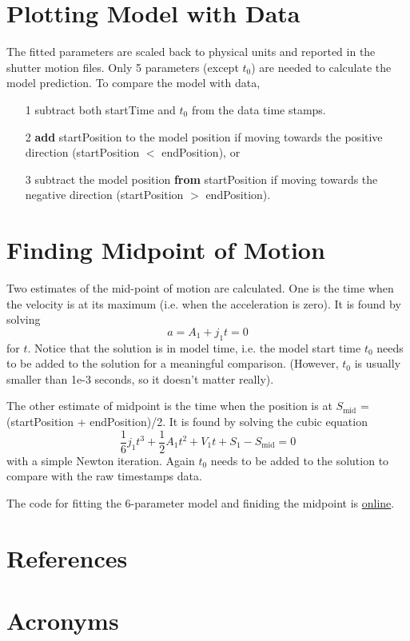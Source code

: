 \documentclass[CTN,lsstdraft,authoryear,toc]{lsstdoc}
\newcommand{\eq}[1]{\begin{equation}#1\end{equation}}
\begin{document}
\section{Plotting Model with Data}
The fitted parameters are scaled back to physical units and reported in the shutter motion files. Only 5 parameters (except $t_0$) are needed to calculate the model prediction. To compare the model with data, 
\begin{itemize}
    \item[1] subtract both startTime and $t_0$ from the data time stamps.
    \item[2] \textbf{add} startPosition to the model position if moving towards the positive direction (startPosition $<$ endPosition), or
    \item[3] subtract the model position \textbf{from} startPosition if moving towards the negative direction (startPosition $>$ endPosition).
\end{itemize}


\section{Finding Midpoint of Motion}
Two estimates of the mid-point of motion are calculated. One is the time when the velocity is at its maximum (i.e. when the acceleration is zero). It is found by solving
\eq{
    a = A_1 + j_1 t = 0
}
for $t$. Notice that the solution is in model time, i.e. the model start time $t_0$ needs to be added to the solution for a meaningful comparison. (However, $t_0$ is usually smaller than 1e-3 seconds, so it doesn't matter really).

The other estimate of midpoint is the time when the position is at $S_{\mathrm{mid}}$ = (startPosition + endPosition)/2. It is found by solving the cubic equation
\eq{
    \frac{1}{6}j_1 t^3 + \frac{1}{2}A_1 t^2 + V_1 t + S_1 - S_{\mathrm{mid}} = 0
}
with a simple Newton iteration. Again $t_0$ needs to be added to the solution to compare with the raw timestamps data.

The code for fitting the 6-parameter model and finiding the midpoint is
\href{https://github.com/shuang92/StandaloneJavaShutterFitter/blob/main/src/main/java/org/lsst/ccs/standalone/shutter/fitter/StandaloneJavaShutterFitter.java}{online}.


\appendix
\section{References} \label{sec:bib}
\renewcommand{\refname}{} %


\section{Acronyms} \label{sec:acronyms}

\end{document}
